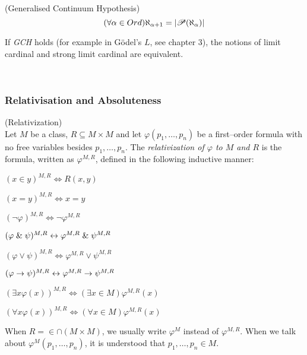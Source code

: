 \begin{definition}{(Generalised Continuum Hypothesis)}\label{def:gch}\\
\begin{equation}
(\forall \alpha \in Ord) \aleph_{\alpha+1}=|\mathscr{P} (\aleph_\alpha)|
\end{equation}
\end{definition}
If \emph{GCH} holds (for example in Gödel's $L$, see chapter 3), the notions of limit cardinal and strong limit cardinal are equivalent.

\

\subsubsection{Relativisation and Absoluteness} %
\begin{definition}{(Relativization)}\label{def:relativization}\\
Let $M$ be a class, $R \subseteq M\times M$ and let $\varphi(p_1, \ldots, p_n)$ be a first–order formula with no free variables besides $p_1, \ldots, p_n$. 
The \emph{relativization of $\varphi$ to $M$ and $R$} is the formula, written as $\varphi^{M, R}$, defined in the following inductive manner:
\bce[(i)]
\item $(x \in y)^{M,R} \iff R(x, y)$
\item $(x = y)^{M,R} \iff x = y$
\item $(\neg \varphi)^{M,R} \iff \neg \varphi^{M,R}$
\item $(\varphi \mathrel{\&} \psi)^{M,R} \leftrightarrow \varphi^{M,R} \mathrel{\&} \psi^{M,R}$
\item $(\varphi \lor \psi)^{M,R} \iff \varphi^{M,R} \lor \psi^{M,R}$
\item $(\varphi \rightarrow \psi)^{M,R} \leftrightarrow \varphi^{M,R} \rightarrow \psi^{M,R}$
\item $(\exists x \varphi(x))^{M,R} \iff (\exists x \in M) \varphi^{M,R}(x)$
\item $(\forall x \varphi(x))^{M,R} \iff (\forall x \in M) \varphi^{M,R}(x)$
\ece

\end{definition}
When $R=\in\cap(M \times M)$, we usually write $\varphi^M$ instead of $\varphi^{M, R}$. When we talk about $\varphi^M(p_1, \ldots, p_n)$, it is understood that $p_1, \ldots, p_n \in M$.


